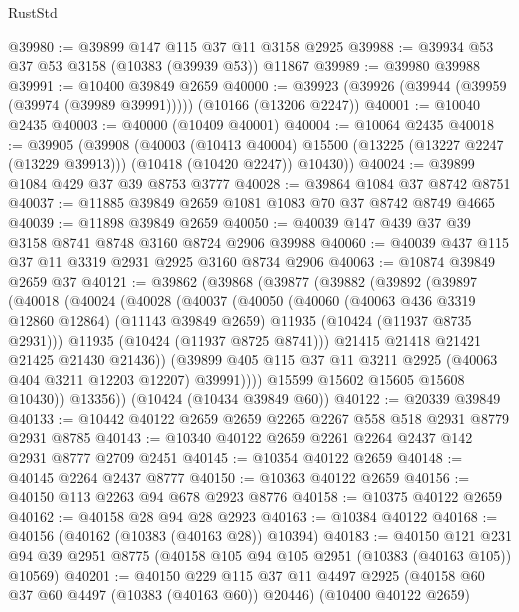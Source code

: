 \begin{lexlean}{RustStd}
\begin{coremodule}
@39980 := @39899 @147 @115 @37 @11 @3158 @2925
@39988 := @39934 @53 @37 @53 @3158 (@10383 (@39939 @53)) @11867
@39989 := @39980 @39988
@39991 := @10400 @39849 @2659
@40000 := @39923 (@39926 (@39944 (@39959 (@39974 (@39989 @39991))))) (@10166 (@13206 @2247))
@40001 := @10040 @2435
@40003 := @40000 (@10409 @40001)
@40004 := @10064 @2435
@40018 := @39905
    (@39908
      (@40003
        (@10413 @40004)
        @15500
        (@13225 (@13227 @2247 (@13229 @39913)))
        (@10418 (@10420 @2247))
        @10430))
@40024 := @39899 @1084 @429 @37 @39 @8753 @3777
@40028 := @39864 @1084 @37 @8742 @8751
@40037 := @11885 @39849 @2659 @1081 @1083 @70 @37 @8742 @8749 @4665
@40039 := @11898 @39849 @2659
@40050 := @40039 @147 @439 @37 @39 @3158 @8741 @8748 @3160 @8724 @2906 @39988
@40060 := @40039 @437 @115 @37 @11 @3319 @2931 @2925 @3160 @8734 @2906
@40063 := @10874 @39849 @2659 @37
@40121 := @39862
    (@39868
      (@39877
        (@39882
          (@39892
            (@39897
              (@40018
                (@40024
                  (@40028
                    (@40037
                      (@40050
                        (@40060
                          (@40063 @436 @3319 @12860 @12864)
                          (@11143 @39849 @2659)
                          @11935
                          (@10424 (@11937 @8735 @2931)))
                        @11935
                        (@10424 (@11937 @8725 @8741)))
                      @21415
                      @21418
                      @21421
                      @21425
                      @21430
                      @21436))
                  (@39899 @405 @115 @37 @11 @3211 @2925 (@40063 @404 @3211 @12203 @12207) @39991))))
            @15599
            @15602
            @15605
            @15608
            @10430))
        @13356))
    (@10424 (@10434 @39849 @60))
@40122 := @20339 @39849
@40133 := @10442 @40122 @2659 @2659 @2265 @2267 @558 @518 @2931 @8779 @2931 @8785
@40143 := @10340 @40122 @2659 @2261 @2264 @2437 @142 @2931 @8777 @2709 @2451
@40145 := @10354 @40122 @2659
@40148 := @40145 @2264 @2437 @8777
@40150 := @10363 @40122 @2659
@40156 := @40150 @113 @2263 @94 @678 @2923 @8776
@40158 := @10375 @40122 @2659
@40162 := @40158 @28 @94 @28 @2923
@40163 := @10384 @40122
@40168 := @40156 (@40162 (@10383 (@40163 @28)) @10394)
@40183 := @40150
    @121
    @231
    @94
    @39
    @2951
    @8775
    (@40158 @105 @94 @105 @2951 (@10383 (@40163 @105)) @10569)
@40201 := @40150
    @229
    @115
    @37
    @11
    @4497
    @2925
    (@40158 @60 @37 @60 @4497 (@10383 (@40163 @60)) @20446)
    (@10400 @40122 @2659)

\end{coremodule}
\end{lexlean}
